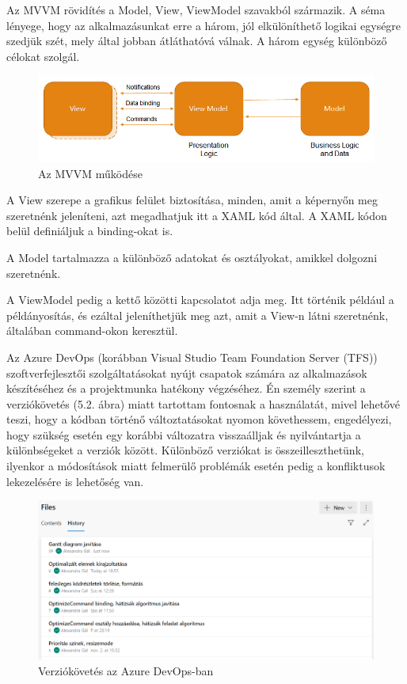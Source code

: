 Az MVVM rövidítés a Model, View, ViewModel szavakból származik. A séma lényege, hogy az alkalmazásunkat erre a három, jól elkülöníthető logikai egységre szedjük szét, mely által jobban átláthatóvá válnak. A három egység különböző célokat szolgál.

\begin{figure}[h]
	\centering
	\includegraphics[scale=0.5]{images/mvvm.png}
	\caption{Az MVVM működése\cite{mvvmpic}}
\end{figure}

A View szerepe a grafikus felület biztosítása, minden, amit a képernyőn meg szeretnénk jeleníteni, azt megadhatjuk itt a XAML kód által. A XAML kódon belül definiáljuk a binding-okat is.

A Model tartalmazza a különböző adatokat és osztályokat, amikkel dolgozni szeretnénk.

A ViewModel pedig a kettő közötti kapcsolatot adja meg. Itt történik például a példányosítás, és ezáltal jeleníthetjük meg azt, amit a View-n látni szeretnénk, általában command-okon keresztül.\cite{mvvm}


Az Azure DevOps (korábban Visual Studio Team Foundation Server (TFS)) szoftverfejlesztői szolgáltatásokat nyújt csapatok számára az alkalmazások készítéséhez és a projektmunka hatékony végzéséhez. Én személy szerint a verziókövetés (5.2. ábra) miatt tartottam fontosnak a használatát, mivel lehetővé teszi, hogy a kódban történő változtatásokat nyomon követhessem, engedélyezi, hogy szükség esetén egy korábbi változatra visszaálljak és nyilvántartja a különbségeket a verziók között. Különböző verziókat is összeilleszthetünk, ilyenkor a módosítások miatt felmerülő problémák esetén pedig a konfliktusok lekezelésére is lehetőség van.\cite{azure}

\begin{figure}[h]
	\centering
	\includegraphics[scale=0.5]{images/azureHistory.png}
	\caption{Verziókövetés az Azure DevOps-ban}
\end{figure}


